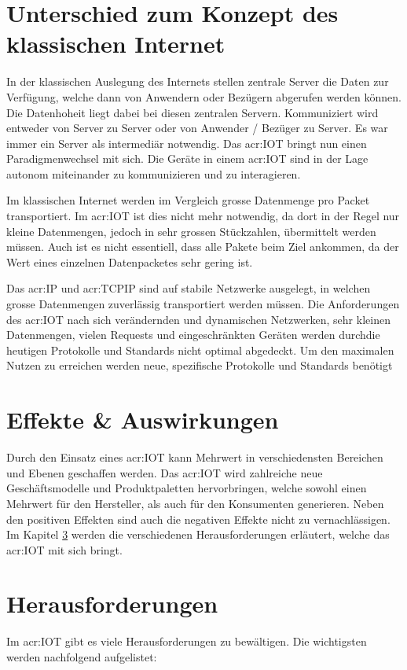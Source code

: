 \section{Unterschied zum Konzept des klassischen Internet}
In der klassischen Auslegung des Internets stellen zentrale Server die Daten zur Verfügung, welche dann von Anwendern oder Bezügern abgerufen werden können. Die Datenhoheit liegt dabei bei diesen zentralen Servern. Kommuniziert wird entweder von Server zu Server oder von Anwender / Bezüger zu Server. Es war immer ein Server als intermediär notwendig. Das \gls{acr:IOT} bringt nun einen Paradigmenwechsel mit sich. Die Geräte in einem \gls{acr:IOT} sind in der Lage autonom miteinander zu kommunizieren und zu interagieren. 

Im klassischen Internet werden im Vergleich grosse Datenmenge pro Packet transportiert. Im \gls{acr:IOT} ist dies nicht mehr notwendig, da dort in der Regel nur kleine Datenmengen, jedoch in sehr grossen Stückzahlen, übermittelt werden müssen. Auch ist es nicht essentiell, dass alle Pakete beim Ziel ankommen, da der Wert eines einzelnen Datenpacketes	sehr gering ist.


Das \gls{acr:IP} und \gls{acr:TCPIP} sind auf stabile Netzwerke ausgelegt, in welchen grosse Datenmengen zuverlässig transportiert werden müssen. Die Anforderungen des \gls{acr:IOT} nach sich verändernden und dynamischen Netzwerken, sehr kleinen Datenmengen, vielen Requests und eingeschränkten Geräten werden durchdie heutigen Protokolle und Standards nicht optimal abgedeckt. Um den maximalen Nutzen zu erreichen werden neue, spezifische Protokolle und Standards benötigt



\section{Effekte \& Auswirkungen}
Durch den Einsatz eines \gls{acr:IOT} kann Mehrwert in verschiedensten Bereichen und Ebenen geschaffen werden. Das \gls{acr:IOT} wird zahlreiche neue Geschäftsmodelle und Produktpaletten hervorbringen, welche sowohl einen Mehrwert für den Hersteller, als auch für den Konsumenten generieren. Neben den positiven Effekten sind auch die negativen Effekte nicht zu vernachlässigen. Im Kapitel \ref{sec:DomainIoT:Challenges}  werden die verschiedenen Herausforderungen erläutert, welche das \gls{acr:IOT} mit sich bringt. 



\section{Herausforderungen} \label{sec:DomainIoT:Challenges}
Im \gls{acr:IOT} gibt es viele Herausforderungen zu bewältigen. Die wichtigsten werden nachfolgend aufgelistet:


